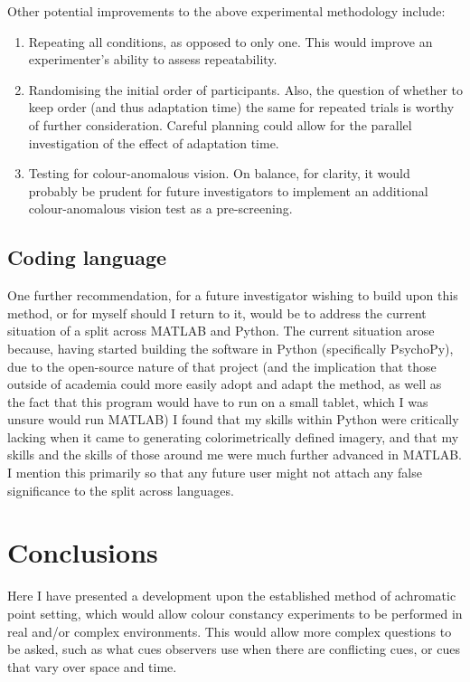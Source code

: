 Other potential improvements to the above experimental methodology include:

\begin{enumerate}
    \item Repeating all conditions, as opposed to only one. This would improve an experimenter's ability to assess repeatability.
    \item Randomising the initial order of participants. Also, the question of whether to keep order (and thus adaptation time) the same for repeated trials is worthy of further consideration. Careful planning could allow for the parallel investigation of the effect of adaptation time.
    \item Testing for colour-anomalous vision. On balance, for clarity, it would probably be prudent for future investigators to implement an additional colour-anomalous vision test as a pre-screening.
\end{enumerate}

\subsection{Coding language}

One further recommendation, for a future investigator wishing to build upon this method, or for myself should I return to it, would be to address the current situation of a split across \gls{MATLAB} and Python. The current situation arose because, having started building the software in Python (specifically PsychoPy), due to the open-source nature of that project (and the implication that those outside of academia could more easily adopt and adapt the method, as well as the fact that this program would have to run on a small tablet, which I was unsure would run \gls{MATLAB}) I found that my skills within Python were critically lacking when it came to generating colorimetrically defined imagery, and that my skills and the skills of those around me were much further advanced in \gls{MATLAB}. I mention this primarily so that any future user might not attach any false significance to the split across languages.

\section{Conclusions}

Here I have presented a development upon the established method of achromatic point setting, which would allow colour constancy experiments to be performed in real and/or complex environments. This would allow more complex questions to be asked, such as what cues observers use when there are conflicting cues, or cues that vary over space and time.

